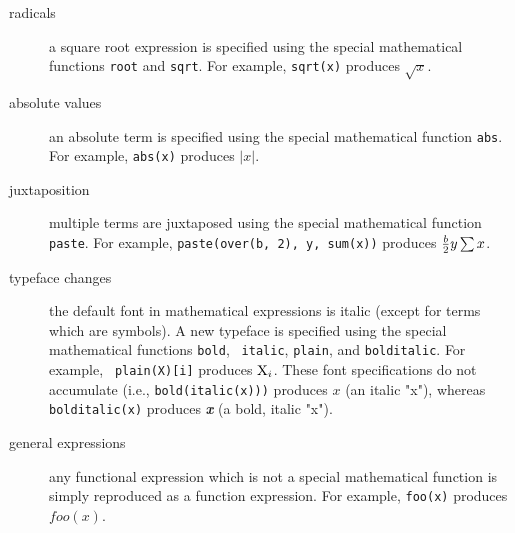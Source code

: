 \begin{description}
\item[radicals]  a square root expression is specified using the
special mathematical functions {\tt root} and {\tt sqrt}.  For
example, {\tt sqrt(x)} produces $\sqrt x$.

\item[absolute values]  an absolute term is specified using the
special mathematical function {\tt abs}.  For example, {\tt abs(x)}
produces $\left|x\right|$.

\item[juxtaposition]  multiple terms are juxtaposed using the special
mathematical function {\tt paste}.  For example, {\tt paste(over(b,
2), y, sum(x))} produces ${b\over2} y \sum x$.

\item[typeface changes]  the default font in mathematical expressions
is italic (except for terms which are symbols).  A new typeface is
specified using the special mathematical functions {\tt bold}, {\tt
italic}, {\tt plain}, and {\tt bolditalic}.  For example, {\tt
plain(X)[i]} produces ${\rm X}_i$. These font specifications do not
accumulate (i.e., {\tt bold(italic(x)))} produces $x$ (an italic "x"),
whereas {\tt bolditalic(x)} produces \textit{\textbf{x}} (a bold, italic "x").

\item[general expressions]  any functional expression which is not a
special mathematical function is simply reproduced as a function
expression.  For example, {\tt foo(x)} produces $foo(x)$.


\end{description}


